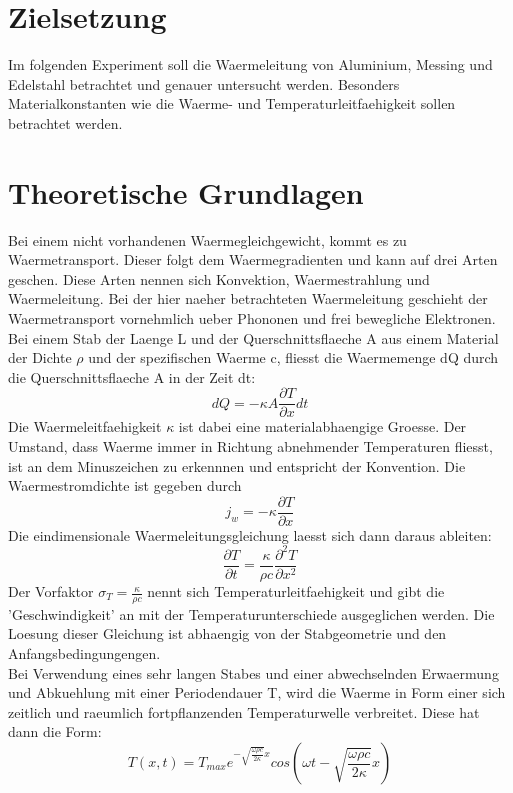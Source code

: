 \section{Zielsetzung}
Im folgenden Experiment soll die Waermeleitung von Aluminium, Messing und Edelstahl betrachtet und genauer untersucht werden. Besonders Materialkonstanten wie die Waerme- und Temperaturleitfaehigkeit sollen betrachtet werden.
\section{Theoretische Grundlagen}
Bei einem nicht vorhandenen Waermegleichgewicht, kommt es zu Waermetransport. Dieser folgt dem Waermegradienten und kann auf drei Arten geschen. Diese Arten nennen sich Konvektion, Waermestrahlung und Waermeleitung. Bei der hier naeher betrachteten Waermeleitung geschieht der Waermetransport vornehmlich ueber Phononen und frei bewegliche Elektronen.
Bei einem Stab der Laenge L und der Querschnittsflaeche A aus einem Material der Dichte $\rho$ und der spezifischen Waerme c, fliesst die Waermemenge dQ durch die Querschnittsflaeche A in der Zeit dt:
\begin{equation}
    dQ=-\kappa A\frac{\partial T}{\partial x}dt
\end{equation}
Die Waermeleitfaehigkeit $\kappa$ ist dabei eine materialabhaengige Groesse. Der Umstand, dass Waerme immer in Richtung abnehmender Temperaturen fliesst, ist an dem Minuszeichen zu erkennnen und entspricht der Konvention.
Die Waermestromdichte ist gegeben durch 
\begin{equation}
    j_w=-\kappa \frac{\partial T}{\partial x}
\end{equation}
Die eindimensionale Waermeleitungsgleichung laesst sich dann daraus ableiten:
\begin{equation}
    \frac{\partial T}{\partial t}=\frac{\kappa}{\rho c}\frac{\partial^2T}{\partial x^2}
\end{equation}
Der Vorfaktor $\sigma_T=\frac{\kappa}{\rho c}$ nennt sich Temperaturleitfaehigkeit und gibt die 'Geschwindigkeit' an mit der Temperaturunterschiede ausgeglichen werden. Die Loesung dieser Gleichung ist abhaengig von der Stabgeometrie und den Anfangsbedingungengen.\\
Bei Verwendung eines sehr langen Stabes und einer abwechselnden Erwaermung und Abkuehlung mit einer Periodendauer T, wird die Waerme in Form einer sich zeitlich und raeumlich fortpflanzenden Temperaturwelle verbreitet. Diese hat dann die Form:
\begin{equation}
    T(x,t)=T_{max}e^{-\sqrt{\frac{\omega \rho c}{2\kappa}}x}cos(\omega t-\sqrt{\frac{\omega \rho c}{2\kappa}}x)
\end{equation}
